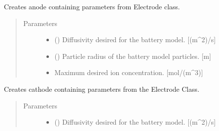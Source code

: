 \documentclass[letterpaper,10pt,english]{sphinxmanual}
\begin{document}
\begin{fulllineitems}
\begin{fulllineitems}
\label{\detokenize{batterycell:batterycell.BatteryCell.create_anode}}
\sphinxAtStartPar
Creates anode containing parameters from Electrode class.
\begin{quote}\begin{description}
\item[{Parameters}] \leavevmode\begin{itemize}
\item {} 
\sphinxAtStartPar
{} (\sphinxstyleliteralemphasis{\sphinxupquote{{[}}}\sphinxstyleliteralemphasis{\sphinxupquote{{]}}}) \textendash{} Diffusivity desired for the battery model. {[}(m\textasciicircum{}2)/s{]}

\item {} 
\sphinxAtStartPar
{} (\sphinxstyleliteralemphasis{\sphinxupquote{{[}}}\sphinxstyleliteralemphasis{\sphinxupquote{{]}}}) \textendash{} Particle radius of the battery model particles. {[}m{]}

\item {} 
\sphinxAtStartPar
{} \textendash{} Maximum desired ion concentration. {[}mol/(m\textasciicircum{}3){]}

\end{itemize}

\end{description}\end{quote}

\end{fulllineitems}


\begin{fulllineitems}
\label{\detokenize{batterycell:batterycell.BatteryCell.create_cathode}}
\sphinxAtStartPar
Creates cathode containing parameters from the Electrode Class.
\begin{quote}\begin{description}
\item[{Parameters}] \leavevmode\begin{itemize}
\item {} 
\sphinxAtStartPar
{} (\sphinxstyleliteralemphasis{\sphinxupquote{{[}}}\sphinxstyleliteralemphasis{\sphinxupquote{{]}}}) \textendash{} Diffusivity desired for the battery model. {[}(m\textasciicircum{}2)/s{]}


\end{itemize}
\end{description}
\end{quote}
\end{fulllineitems}
\end{fulllineitems}
\end{document}
